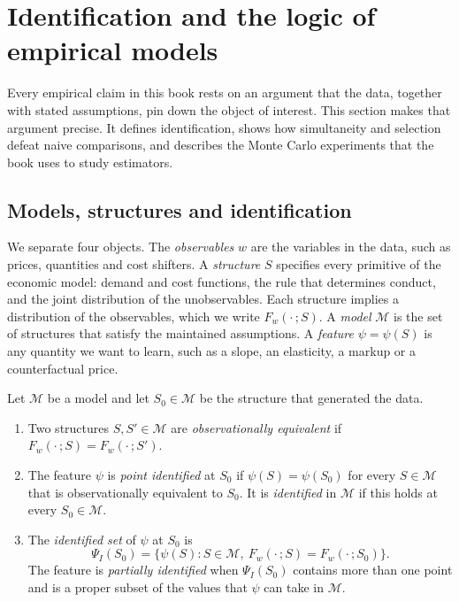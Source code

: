 \section{Identification and the logic of empirical models}\label{sec:A-identification}

Every empirical claim in this book rests on an argument that the data, together with stated assumptions,
pin down the object of interest. This section makes that argument precise. It defines identification,
shows how simultaneity and selection defeat naive comparisons, and describes the Monte Carlo experiments
that the book uses to study estimators.

\subsection{Models, structures and identification}\label{sec:A-models}

We separate four objects. The \emph{observables} $w$ are the variables in the data, such as prices,
quantities and cost shifters. A \emph{structure} $S$ specifies every primitive of the economic model:
demand and cost functions, the rule that determines conduct, and the joint distribution of the
unobservables. Each structure implies a distribution of the observables, which we write $F_w(\cdot\,; S)$.
A \emph{model} $\mathcal{M}$ is the set of structures that satisfy the maintained assumptions. A
\emph{feature} $\psi = \psi(S)$ is any quantity we want to learn, such as a slope, an elasticity, a markup
or a counterfactual price.

\begin{definition}[Identification]\label{def:A-identification}
Let $\mathcal{M}$ be a model and let $S_0 \in \mathcal{M}$ be the structure that generated the data.
\begin{enumerate}[label=(\roman*)]
\item Two structures $S, S' \in \mathcal{M}$ are \emph{observationally equivalent} if
  $F_w(\cdot\,; S) = F_w(\cdot\,; S')$.
\item The feature $\psi$ is \emph{point identified} at $S_0$ if $\psi(S) = \psi(S_0)$ for every
  $S \in \mathcal{M}$ that is observationally equivalent to $S_0$. It is \emph{identified} in $\mathcal{M}$
  if this holds at every $S_0 \in \mathcal{M}$.
\item The \emph{identified set} of $\psi$ at $S_0$ is
  \begin{equation*}
  \Psi_I(S_0) = \bigl\{\psi(S) : S \in \mathcal{M},\ F_w(\cdot\,; S) = F_w(\cdot\,; S_0)\bigr\}.
  \end{equation*}
  The feature is \emph{partially identified} when $\Psi_I(S_0)$ contains more than one point and is a
  proper subset of the values that $\psi$ can take in $\mathcal{M}$.
\end{enumerate}
\end{definition}

